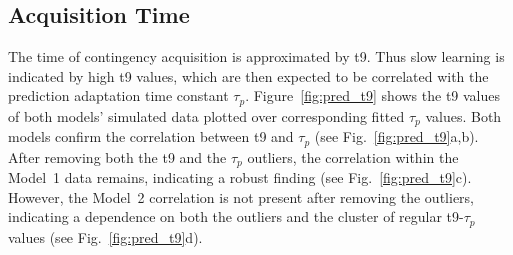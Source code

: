 \documentclass[a4paper]{scrreprt}
\begin{document}
\clearpage

\subsection{Acquisition Time}
\label{sec:t9}

The time of contingency acquisition is approximated by t9. Thus slow learning is indicated by high t9 values, which are then expected to be correlated with the prediction adaptation time constant $\tau_p$. Figure~\ref{fig:pred_t9} shows the t9 values of both models' simulated data plotted over corresponding fitted $\tau_p$ values. Both models confirm the correlation between t9 and $\tau_p$ (see Fig.~\ref{fig:pred_t9}a,b). After removing both the t9 and the $\tau_p$ outliers, the correlation within the Model~1 data remains, indicating a robust finding (see Fig.~\ref{fig:pred_t9}c). However, the Model~2 correlation is not present after removing the outliers, indicating a dependence on both the outliers and the cluster of regular t9-$\tau_p$ values (see Fig.~\ref{fig:pred_t9}d).
\end{document}
